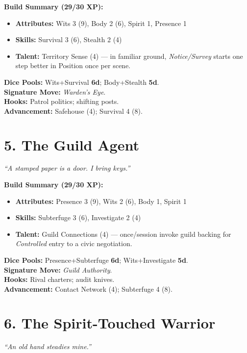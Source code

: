 \begin{multicols}{2}
\textbf{Build Summary (29/30 XP):}
\begin{itemize}
  \item \textbf{Attributes:} Wits 3 (9), Body 2 (6), Spirit 1, Presence 1
  \item \textbf{Skills:} Survival 3 (6), Stealth 2 (4)
  \item \textbf{Talent:} Territory Sense (4) — in familiar ground, \emph{Notice/Survey} starts one step better in Position once per scene.
\end{itemize}
\textbf{Dice Pools:} Wits+Survival \textbf{6d}; Body+Stealth \textbf{5d}.\\
\textbf{Signature Move:} \emph{Warden’s Eye}.\\
\textbf{Hooks:} Patrol politics; shifting posts.\\
\textbf{Advancement:} Safehouse (4); Survival 4 (8).

\section{5. The Guild Agent}
\textit{“A stamped paper is a door. I bring keys.”}

\textbf{Build Summary (29/30 XP):}
\begin{itemize}
  \item \textbf{Attributes:} Presence 3 (9), Wits 2 (6), Body 1, Spirit 1
  \item \textbf{Skills:} Subterfuge 3 (6), Investigate 2 (4)
  \item \textbf{Talent:} Guild Connections (4) — once/session invoke guild backing for \emph{Controlled} entry to a civic negotiation.
\end{itemize}
\textbf{Dice Pools:} Presence+Subterfuge \textbf{6d}; Wits+Investigate \textbf{5d}.\\
\textbf{Signature Move:} \emph{Guild Authority}.\\
\textbf{Hooks:} Rival charters; audit knives.\\
\textbf{Advancement:} Contact Network (4); Subterfuge 4 (8).

\section{6. The Spirit-Touched Warrior}
\textit{“An old hand steadies mine.”}


\end{multicols}
